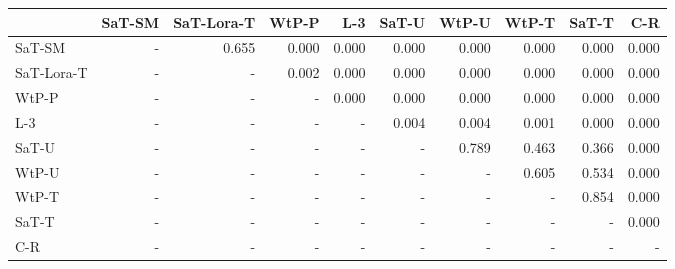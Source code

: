 \begin{tabular}{lrrrrrrrrr}
\toprule
 & SaT-SM & SaT-Lora-T & WtP-P & L-3 & SaT-U & WtP-U & WtP-T & SaT-T & C-R \\
\midrule
SaT-SM & - & 0.655 & 0.000 & 0.000 & 0.000 & 0.000 & 0.000 & 0.000 & 0.000 \\
SaT-Lora-T & - & - & 0.002 & 0.000 & 0.000 & 0.000 & 0.000 & 0.000 & 0.000 \\
WtP-P & - & - & - & 0.000 & 0.000 & 0.000 & 0.000 & 0.000 & 0.000 \\
L-3 & - & - & - & - & 0.004 & 0.004 & 0.001 & 0.000 & 0.000 \\
SaT-U & - & - & - & - & - & 0.789 & 0.463 & 0.366 & 0.000 \\
WtP-U & - & - & - & - & - & - & 0.605 & 0.534 & 0.000 \\
WtP-T & - & - & - & - & - & - & - & 0.854 & 0.000 \\
SaT-T & - & - & - & - & - & - & - & - & 0.000 \\
C-R & - & - & - & - & - & - & - & - & - \\
\bottomrule
\end{tabular}

